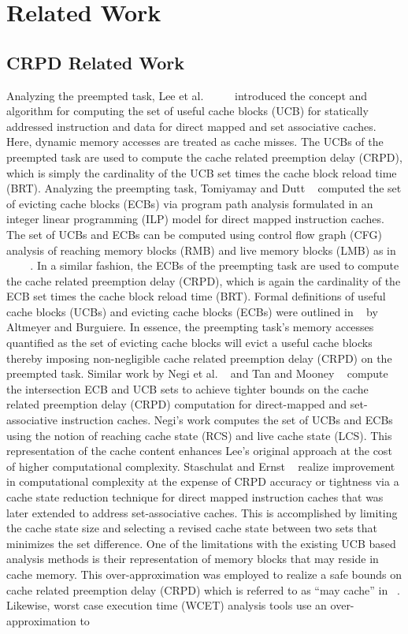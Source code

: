 \section{Related Work}\label{sec:related}

\subsection {CRPD Related Work}\label{sec:crpd_related_work}
Analyzing the preempted task, Lee et al. ~\cite{lee:96} ~\cite{lee:97} ~\cite{lee:98} introduced the concept and algorithm for computing the set of useful cache blocks (UCB) for statically addressed instruction and data for direct mapped and set associative caches.  Here, dynamic memory accesses are treated as cache misses.  The UCBs of the preempted task are used to compute the cache related preemption delay (CRPD), which is simply the cardinality of the UCB set times the cache block reload time (BRT).  Analyzing the preempting task, Tomiyamay and Dutt ~\cite{tomiyamay:00} computed the set of evicting cache blocks (ECBs) via program path analysis formulated in an integer linear programming (ILP) model for direct mapped instruction caches.  The set of UCBs and ECBs can be computed using control flow graph (CFG) analysis of reaching memory blocks (RMB) and live memory blocks (LMB) as in ~\cite{lee:96} ~\cite{lee:97} ~\cite{lee:98}. In a similar fashion, the ECBs of the preempting task are used to compute the cache related preemption delay (CRPD), which is again the cardinality of the ECB set times the cache block reload time (BRT). Formal definitions of useful cache blocks (UCBs) and evicting cache blocks (ECBs) were outlined in ~\cite{altmeyer:11c} by Altmeyer and Burguiere.  In essence, the preempting task’s memory accesses quantified as the set of evicting cache blocks will evict a useful cache blocks thereby imposing non-negligible cache related preemption delay (CRPD) on the preempted task.  Similar work by Negi et al. ~\cite{negi:03} and Tan and Mooney ~\cite{tan:04} compute the intersection ECB and UCB sets to achieve tighter bounds on the cache related preemption delay (CRPD) computation for direct-mapped and set-associative instruction caches. Negi’s work computes the set of UCBs and ECBs using the notion of reaching cache state (RCS) and live cache state (LCS). This representation of the cache content enhances Lee’s original approach at the cost of higher computational complexity. Staschulat and Ernst ~\cite{staschulat:05c} realize improvement in computational complexity at the expense of CRPD accuracy or tightness via a cache state reduction technique for direct mapped instruction caches that was later extended to address set-associative caches. This is accomplished by limiting the cache state size and selecting a revised cache state between two sets that minimizes the set difference.  One of the limitations with the existing UCB based analysis methods is their representation of memory blocks that may reside in cache memory.  This over-approximation was employed to realize a safe bounds on cache related preemption delay (CRPD) which is referred to as “may cache” in ~\cite{altmeyer:11c}.  Likewise, worst case execution time (WCET) analysis tools use an over-approximation to 